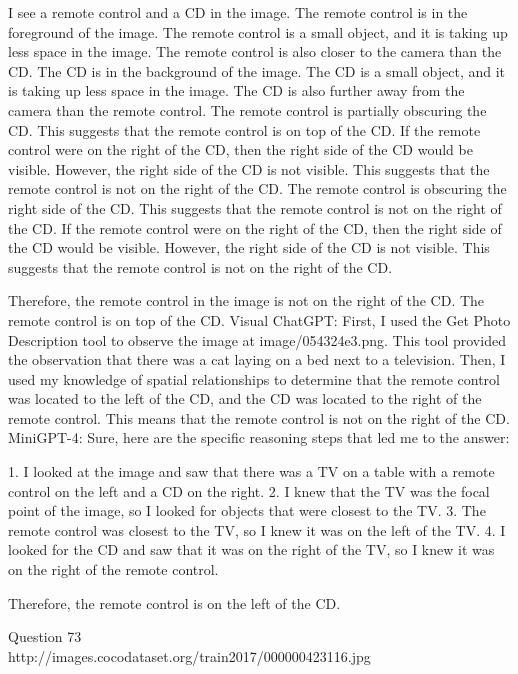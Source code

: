 \begin{enumerate}
    I see a remote control and a CD in the image.
    The remote control is in the foreground of the image. The remote control is a small object, and it is taking up less space in the image. The remote control is also closer to the camera than the CD.
    The CD is in the background of the image. The CD is a small object, and it is taking up less space in the image. The CD is also further away from the camera than the remote control.
    The remote control is partially obscuring the CD. This suggests that the remote control is on top of the CD.
    If the remote control were on the right of the CD, then the right side of the CD would be visible. However, the right side of the CD is not visible. This suggests that the remote control is not on the right of the CD.
    The remote control is obscuring the right side of the CD. This suggests that the remote control is not on the right of the CD. If the remote control were on the right of the CD, then the right side of the CD would be visible. However, the right side of the CD is not visible. This suggests that the remote control is not on the right of the CD.
    
    Therefore, the remote control in the image is not on the right of the CD. The remote control is on top of the CD.
    \subitem Visual ChatGPT: First, I used the Get Photo Description tool to observe the image at image/054324e3.png. This tool provided the observation that there was a cat laying on a bed next to a television. Then, I used my knowledge of spatial relationships to determine that the remote control was located to the left of the CD, and the CD was located to the right of the remote control. This means that the remote control is not on the right of the CD.
    \subitem MiniGPT-4: Sure, here are the specific reasoning steps that led me to the answer:

    1. I looked at the image and saw that there was a TV on a table with a remote control on the left and a CD on the right.
    2. I knew that the TV was the focal point of the image, so I looked for objects that were closest to the TV.
    3. The remote control was closest to the TV, so I knew it was on the left of the TV.
    4. I looked for the CD and saw that it was on the right of the TV, so I knew it was on the right of the remote control.
    
    Therefore, the remote control is on the left of the CD.
\end{enumerate}
Question 73\\
http://images.cocodataset.org/train2017/000000423116.jpg
